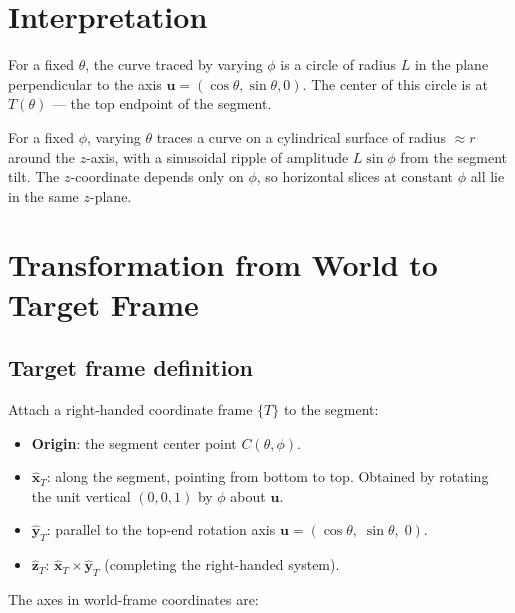 \documentclass[12pt,a4paper]{article}
\begin{document}
\section{Interpretation}

For a fixed $\theta$, the curve traced by varying $\phi$ is a circle of radius $L$ in
the plane perpendicular to the axis $\mathbf{u} = (\cos\theta, \sin\theta, 0)$.
The center of this circle is at $T(\theta)$ — the top endpoint of the segment.

For a fixed $\phi$, varying $\theta$ traces a curve on a cylindrical surface of
radius $\approx r$ around the $z$-axis, with a sinusoidal ripple of amplitude
$L\sin\phi$ from the segment tilt.
The $z$-coordinate depends only on $\phi$, so horizontal slices at constant $\phi$
all lie in the same $z$-plane.

\section{Transformation from World to Target Frame}

\subsection{Target frame definition}

Attach a right-handed coordinate frame $\{T\}$ to the segment:

\begin{itemize}[leftmargin=*]
  \item \textbf{Origin}: the segment center point $C(\theta,\phi)$.
  \item \textbf{$\hat{\mathbf{x}}_T$}: along the segment, pointing from bottom to top.
    Obtained by rotating the unit vertical $(0,0,1)$ by $\phi$ about $\mathbf{u}$.
  \item \textbf{$\hat{\mathbf{y}}_T$}: parallel to the top-end rotation axis
    $\mathbf{u} = (\cos\theta,\;\sin\theta,\;0)$.
  \item \textbf{$\hat{\mathbf{z}}_T$}: $\hat{\mathbf{x}}_T \times \hat{\mathbf{y}}_T$
    (completing the right-handed system).
\end{itemize}

The axes in world-frame coordinates are:
\end{document}
